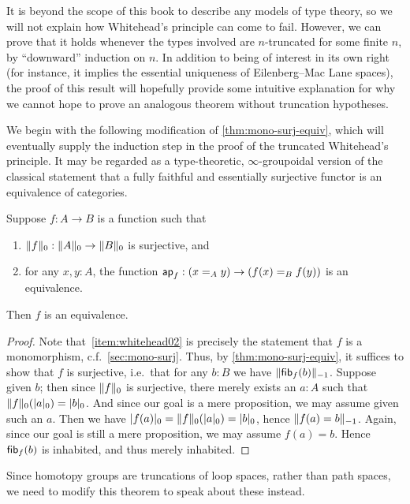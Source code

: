 It is beyond the scope of this book to describe any models of type theory, so we will not explain how Whitehead's principle can come to fail.
However, we can prove that it holds whenever the types involved are $n$-truncated for some finite $n$, by ``downward'' induction on $n$.
In addition to being of interest in its own right (for instance, it implies the essential uniqueness of Eilenberg--Mac Lane spaces), the proof of this result will hopefully provide some intuitive explanation for why we cannot hope to prove an analogous theorem without truncation hypotheses.

We begin with the following modification of \autoref{thm:mono-surj-equiv}, which will eventually supply the induction step in the proof of the truncated Whitehead's principle.
It may be regarded as a type-theoretic, $\infty$-groupoidal version of the classical statement that a fully faithful and essentially surjective functor is an equivalence of categories.

\begin{thm}\label{thm:whitehead0}
  Suppose $f:A\to B$ is a function such that
  \begin{enumerate}
  \item $\trunc0 f : \trunc0 A \to \trunc0 B$ is surjective, and\label{item:whitehead01}
  \item for any $x,y:A$, the function $\apfunc f : (\id[A]xy) \to (\id[B]{f(x)}{f(y)})$ is an equivalence.\label{item:whitehead02}
  \end{enumerate}
  Then $f$ is an equivalence.
\end{thm}
\begin{proof}
  Note that~\ref{item:whitehead02} is precisely the statement that $f$ is a monomorphism, c.f.~\autoref{sec:mono-surj}.
  Thus, by \autoref{thm:mono-surj-equiv}, it suffices to show that $f$ is surjective, i.e.\ that for any $b:B$ we have $\trunc{-1}{\hfib f b}$.
  Suppose given $b$; then since $\trunc0 f$ is surjective, there merely exists an $a:A$ such that $\trunc 0 f(\tproj0a) = \tproj0b$.
  And since our goal is a mere proposition, we may assume given such an $a$.
  Then we have $\tproj0{f(a)} = \trunc 0 f(\tproj0a) =\tproj0b$, hence $\trunc{-1}{f(a)=b}$.
  Again, since our goal is still a mere proposition, we may assume $f(a)=b$.
  Hence $\hfib f b$ is inhabited, and thus merely inhabited.
\end{proof}

Since homotopy groups are truncations of loop spaces, rather than path spaces, we need to modify this theorem to speak about these instead.

